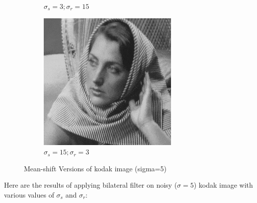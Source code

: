 \documentclass[12pt]{article}
\begin{document}
\begin{figure}[h]
\begin{subfigure}[b]{0.24\textwidth}
        \caption{$\sigma_s=3;\sigma_r=15$}
        \label{fig:subfig3}
    \end{subfigure}
    \begin{subfigure}[b]{0.24\textwidth}
        \centering
        \includegraphics[width=\textwidth]{../images/filtered_barbara256_meanshift_sigma_s_15_sigma_r_3.png}
        \caption{$\sigma_s=15;\sigma_r=3$}
        \label{fig:subfig3}
    \end{subfigure}
    
    \caption{Mean-shift Versions of kodak image (sigma=5)}
    \label{fig:overall}
\end{figure}


Here are the results of applying bilateral filter on noisy ($\sigma = 5$) kodak image with various values of $\sigma_s$ and $\sigma_r$:
\end{document}
